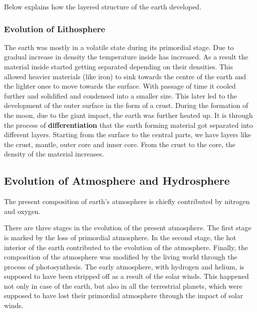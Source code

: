 \documentclass[8pt, a4paper, oneside, twocolumn]{extarticle}
\begin{document}
Below explains how the layered structure of the earth developed.
\subsubsection{Evolution of Lithosphere}
The earth was mostly in a volatile state during its primordial stage. Due to gradual increase in density the temperature inside has increased. As a result the material inside started getting separated depending on their densities. This allowed heavier materials (like iron) to sink towards the centre of the earth and the lighter ones to move towards the surface. With passage of time it cooled further and solidified and condensed into a smaller size. This later led to the development of the outer surface in the form of a crust. During the formation of the moon, due to the giant impact, the earth was further heated up. It is through the process of \textbf{differentiation} that the earth forming material got separated into different layers. Starting from the surface to the central parts, we have layers like the crust, mantle, outer core and inner core. From the crust to the core, the density of the material increases.

\subsection{Evolution of Atmosphere and Hydrosphere}

The present composition of earth’s atmosphere is chiefly contributed by nitrogen and oxygen.

There are three stages in the evolution of the present atmosphere. The first stage is marked by the loss of primordial atmosphere. In the second stage, the hot interior of the earth contributed to the evolution of the atmosphere. Finally, the composition of the atmosphere was modified by the living world through the process of photosynthesis. The early atmosphere, with hydrogen and helium, is supposed to have been stripped off as a result of the solar winds. This happened not only in case of the earth, but also in all the terrestrial planets, which were supposed to have lost their primordial atmosphere through the impact of solar winds.
\end{document}
